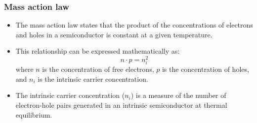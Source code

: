 \begin{frame}
    \frametitle{Mass action law}
    \begin{itemize}
        \item The mass action law states that the product of the concentrations of electrons and holes in a semiconductor is constant at a given temperature.
        \item This relationship can be expressed mathematically as:
        \begin{equation}
            n \cdot p = n_i^2
        \end{equation}
        where $n$ is the concentration of free electrons, $p$ is the concentration of holes, and $n_i$ is the intrinsic carrier concentration.
        \item The intrinsic carrier concentration ($n_i$) is a measure of the number of electron-hole pairs generated in an intrinsic semiconductor at thermal equilibrium.
    \end{itemize}
\end{frame}

